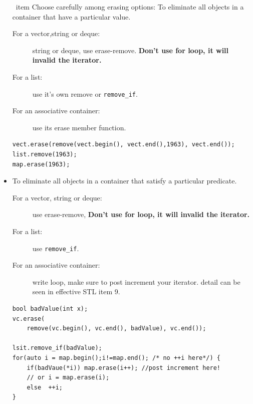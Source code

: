 \documentclass[a4paper,11pt,twoside]{book}
\begin{document}
\begin{itemize}
\	item Choose carefully among erasing options:  To eliminate all objects in a container that have a particular value.
\begin{description}
\item [For a vector,string or deque:] string or deque, use erase-remove. \textbf{Don't use for loop, it will invalid the iterator.}

\item [For a list:] use it's own remove or \texttt{remove\_if}.

\item [For an associative container:] use its erase member function.
\end{description}

\begin{lstlisting}[numbers=none]
vect.erase(remove(vect.begin(), vect.end(),1963), vect.end());
list.remove(1963);
map.erase(1963);
\end{lstlisting}

\item  To eliminate all objects in a container that satisfy a particular predicate.
\begin{description}
	\item [For a vector, string or deque:] use erase-remove, \textbf{Don't use for loop, it will invalid the iterator.}
	
	\item [For a list:] use \texttt{remove\_if}.
	
	\item [For an associative container:] write loop, make sure to post increment your iterator. detail can be seen in effective STL item 9.
\end{description} 
\begin{lstlisting}[numbers=none]
bool badValue(int x);
vc.erase(
	remove(vc.begin(), vc.end(), badValue), vc.end());

lsit.remove_if(badValue);
for(auto i = map.begin();i!=map.end(); /* no ++i here*/) {
	if(badVaue(*i)) map.erase(i++); //post increment here!
	// or i = map.erase(i);
	else  ++i;
}
\end{lstlisting}


\end{itemize}
\end{document}

